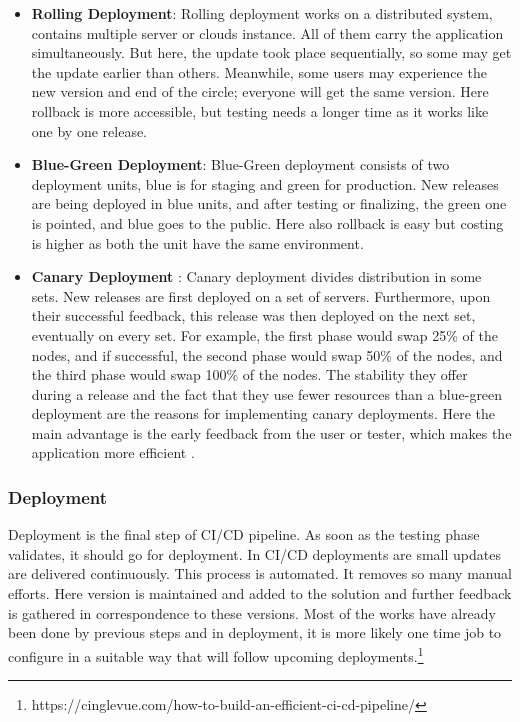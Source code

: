   
\begin{itemize}
    
\item \textbf{Rolling Deployment}: Rolling deployment works on a distributed system, contains multiple server or clouds instance. All of them carry the application simultaneously. But here, the update took place sequentially, so some may get the update earlier than others. Meanwhile, some users may experience the new version and end of the circle; everyone will get the same version. Here rollback is more accessible, but testing needs a longer time as it works like one by one release.
    
    
\item \textbf{Blue-Green Deployment}: Blue-Green deployment consists of two deployment units, blue is for staging and green for production. New releases are being deployed in blue units, and after testing or finalizing, the green one is pointed, and blue goes to the public. Here also rollback is easy but costing is higher as both the unit have the same environment.
     
    
\item \textbf{Canary Deployment} : Canary deployment divides distribution in some sets. New releases are first deployed on a set of servers. Furthermore, upon their successful feedback, this release was then deployed on the next set, eventually on every set. For example, the first phase would swap 25\% of the nodes, and if successful, the second phase would swap 50\% of the nodes, and the third phase would swap 100\% of the nodes. The stability they offer during a release and the fact that they use fewer resources than a blue-green deployment are the reasons for implementing canary deployments. Here the main advantage is the early feedback from the user or tester, which makes the application more efficient \cite{inproceedingsMunch}.
  
\end{itemize}


\subsubsection{Deployment}

Deployment is the final step of CI/CD pipeline. As soon as the testing phase validates, it should go for deployment. In CI/CD deployments are small updates are delivered continuously. This process is automated. It removes so many manual efforts. Here version is maintained and added to the solution and further feedback is gathered in correspondence to these versions. Most of the works have already been done by previous steps and in deployment, it is more likely one time job to configure in a suitable way that will follow upcoming deployments.\footnote{https://cinglevue.com/how-to-build-an-efficient-ci-cd-pipeline/}


